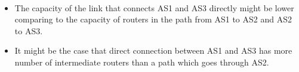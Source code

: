 \begin{tcolorbox}
    \mysolution{} \\
    \begin{itemize}
        \item The capacity of the link that connects AS1 and AS3 directly might be lower 
            comparing to the capacity of routers in the path from AS1 to AS2 and AS2 to AS3.
        \item It might be the case that direct connection between AS1 and AS3 has more number of
            intermediate routers than a path which goes through AS2. 
    \end{itemize}
\end{tcolorbox}




